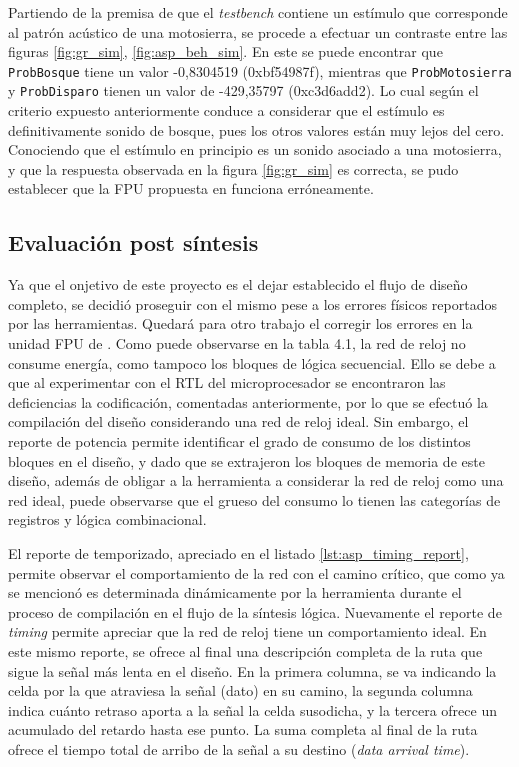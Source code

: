 Partiendo de la premisa de que el \textit{testbench} contiene un estímulo que corresponde al patrón acústico de una motosierra, se procede a efectuar un contraste entre las figuras \ref{fig:gr_sim}, \ref{fig:asp_beh_sim}. En este se puede encontrar que \texttt{ProbBosque} tiene un valor -0,8304519 (0xbf54987f), mientras que \texttt{ProbMotosierra} y \texttt{ProbDisparo} tienen un valor de -429,35797 (0xc3d6add2). Lo cual según el criterio expuesto anteriormente conduce a considerar que el estímulo es definitivamente sonido de bosque, pues los otros valores están muy lejos del cero. Conociendo que el estímulo en principio es un sonido asociado a una motosierra, y que la respuesta observada en la figura \ref{fig:gr_sim} es correcta, se pudo establecer que la FPU propuesta en \cite{Francis2016} funciona erróneamente. 

\subsection{Evaluación post síntesis}

Ya que el onjetivo de este proyecto es el dejar establecido el flujo de diseño completo, se decidió proseguir con el mismo pese a los errores físicos reportados por las herramientas. Quedará para otro trabajo el corregir los errores en la unidad FPU de \cite{Francis2016}.
Como puede observarse en la tabla 4.1, la red de reloj no consume energía, como tampoco los bloques de lógica secuencial. Ello se debe a que al experimentar con el RTL del microprocesador se encontraron las deficiencias la codificación, comentadas anteriormente, por lo que se efectuó la compilación del diseño considerando una red de reloj ideal. Sin embargo, el reporte de potencia permite identificar el grado de consumo de los distintos bloques en el diseño, y dado que se extrajeron los bloques de memoria de este diseño, además de obligar a la herramienta a considerar la red de reloj como una red ideal, puede observarse que el grueso del consumo lo tienen las categorías de registros y lógica combinacional.

El reporte de temporizado, apreciado en el listado \ref{lst:asp_timing_report}, permite observar el comportamiento de la red con el camino crítico, que como ya se mencionó es determinada dinámicamente por la herramienta durante el proceso de compilación en el flujo de la síntesis lógica. Nuevamente el reporte de \textit{timing} permite apreciar que la red de reloj tiene un comportamiento ideal. En este mismo reporte, se ofrece al final una descripción completa de la ruta que sigue la señal más lenta en el diseño. En la primera columna, se va indicando la celda por la que atraviesa la señal (dato) en su camino, la segunda columna indica cuánto retraso aporta a la señal la celda susodicha, y la tercera ofrece un acumulado del retardo hasta ese punto. La suma completa al final de la ruta ofrece el tiempo total de arribo de la señal a su destino (\textit{data arrival time}).

